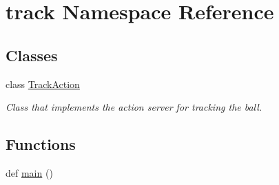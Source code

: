 \hypertarget{namespacetrack}{}\section{track Namespace Reference}
\label{namespacetrack}
\subsection*{Classes}
\begin{DoxyCompactItemize}
\item 
class \hyperlink{classtrack_1_1TrackAction}{Track\+Action}
\begin{DoxyCompactList}\small\item\em Class that implements the action server for tracking the ball. \end{DoxyCompactList}\end{DoxyCompactItemize}
\subsection*{Functions}
\begin{DoxyCompactItemize}
\item 
def \hyperlink{namespacetrack_a30188f067a9106a2f3e2ecedfd9cc52a}{main} ()
\end{DoxyCompactItemize}
